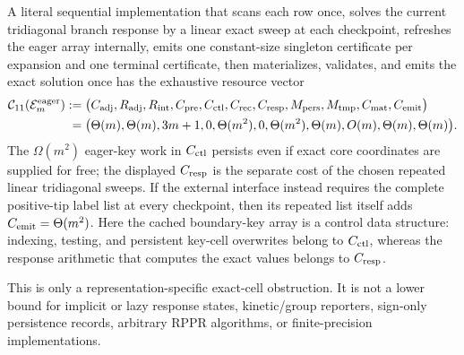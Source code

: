 \begin{proposition}
A literal sequential implementation that scans each row once, solves the
current tridiagonal branch response by a linear exact sweep at each
checkpoint, refreshes the eager array internally, emits one constant-size
singleton certificate per expansion and one terminal certificate, then
materializes, validates, and emits the exact solution once has the exhaustive
resource vector
\begin{equation}
 \begin{aligned}
 \mathcal C_{11}(\mathcal E_m^{\rm eager})
 :=\bigl(&C_{\rm adj},R_{\rm adj},R_{\rm int},C_{\rm pre},C_{\rm ctl},
 C_{\rm rec},C_{\rm resp},M_{\rm pers},M_{\rm tmp},C_{\rm mat},C_{\rm emit}
 \bigr)\\
 =\bigl(&\Theta(m),\Theta(m),3m+1,0,\Theta(m^2),0,
 \Theta(m^2),\Theta(m),O(m),\Theta(m),\Theta(m)\bigr).
 \end{aligned}
 \label{eq:branch-caterpillar-eager-eleven-vector}
\end{equation}
The $\Omega(m^2)$ eager-key work in $C_{\rm ctl}$ persists even if exact core
coordinates are supplied for free; the displayed $C_{\rm resp}$ is the
separate cost of the chosen repeated linear tridiagonal sweeps.  If the
external interface instead requires the complete positive-tip label list at
every checkpoint, then its repeated list itself adds
$C_{\rm emit}=\Theta(m^2)$.
Here the cached boundary-key array is a control data structure: indexing,
testing, and persistent key-cell overwrites belong to $C_{\rm ctl}$, whereas
the response arithmetic that computes the exact values belongs to
$C_{\rm resp}$.

This is only a representation-specific exact-cell obstruction.  It is not a
lower bound for implicit or lazy response states, kinetic/group reporters,
sign-only persistence records, arbitrary RPPR algorithms, or finite-precision
implementations.
\end{proposition}

